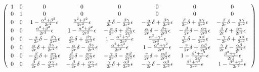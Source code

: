 \documentclass[12pt]{article}
\begin{document}
$$
\left( \begin{array}{cccccccc}
1 & 0 & 0 & 0 & 0 & 0 & 0 & 0 \\
0 & 1 & 0 & 0 & 0 & 0 & 0 & 0 \\
0 & 0 & 1 - {\alpha^2+\beta^2 \over 2 r^2} \epsilon &
{\alpha^2 + \beta^2 \over 2 r^2} \epsilon &
{\alpha \over 2 r}\delta - {\beta \gamma \over 2 r^2}\epsilon &
-{\alpha \over 2 r}\delta + {\beta \gamma \over 2 r^2}\epsilon &
{\beta \over 2 r}\delta + {\alpha \gamma \over 2 r^2}\epsilon &
-{\beta \over 2 r}\delta -{\alpha \gamma \over 2 r^2}\epsilon \\
0 & 0 & {\alpha^2 + \beta^2 \over 2 r^2} \epsilon &
1 - {\alpha^2+\beta^2 \over 2 r^2} \epsilon &
-{\alpha \over 2 r}\delta + {\beta \gamma \over 2 r^2}\epsilon &
{\alpha \over 2 r}\delta - {\beta \gamma \over 2 r^2}\epsilon &
-{\beta \over 2 r}\delta -{\alpha \gamma \over 2 r^2}\epsilon &
{\beta \over 2 r}\delta + {\alpha \gamma \over 2 r^2}\epsilon \\
0 & 0 &
-{\alpha \over 2 r}\delta - {\beta \gamma \over 2 r^2}\epsilon &
{\alpha \over 2 r}\delta + {\beta \gamma \over 2 r^2}\epsilon &
1 - {\alpha^2 + \gamma^2 \over 2 r^2} \epsilon &
{\alpha^2 + \gamma^2 \over 2 r^2} \epsilon &
{\gamma \over 2 r}\delta - {\alpha \beta \over 2 r^2}\epsilon &
-{\gamma \over 2 r}\delta + {\alpha \beta \over 2 r^2}\epsilon \\
0 & 0 &
{\alpha \over 2 r}\delta + {\beta \gamma \over 2 r^2}\epsilon &
-{\alpha \over 2 r}\delta - {\beta \gamma \over 2 r^2}\epsilon &
{\alpha^2 + \gamma^2 \over 2 r^2} \epsilon &
1 - {\alpha^2 + \gamma^2 \over 2 r^2} \epsilon &
-{\gamma \over 2 r}\delta + {\alpha \beta \over 2 r^2}\epsilon &
{\gamma \over 2 r}\delta - {\alpha \beta \over 2 r^2}\epsilon \\
0 & 0 &
-{\beta \over 2 r}\delta + {\alpha \gamma \over 2 r^2}\epsilon &
{\beta \over 2 r}\delta - {\alpha \gamma \over 2 r^2}\epsilon &
-{\gamma \over 2 r}\delta - {\alpha \beta \over 2 r^2}\epsilon &
{\gamma \over 2 r}\delta + {\alpha \beta \over 2 r^2}\epsilon &
1 - {\beta^2 + \gamma^2 \over 2 r^2}\epsilon &
{\beta^2 + \gamma^2 \over 2 r^2}\epsilon \\
0 & 0 &
{\beta \over 2 r}\delta - {\alpha \gamma \over 2 r^2}\epsilon &
-{\beta \over 2 r}\delta + {\alpha \gamma \over 2 r^2}\epsilon &
{\gamma \over 2 r}\delta + {\alpha \beta \over 2 r^2}\epsilon &
-{\gamma \over 2 r}\delta - {\alpha \beta \over 2 r^2}\epsilon &
{\beta^2 + \gamma^2 \over 2 r^2}\epsilon &
1 - {\beta^2 + \gamma^2 \over 2 r^2}\epsilon
\end{array} \right)
$$
\end{document}
